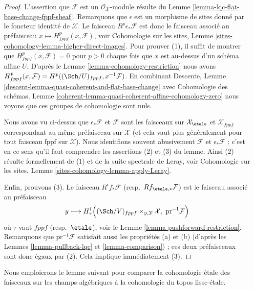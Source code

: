 \begin{proof}
L'assertion que $\mathcal{F}$ est un $\mathcal{O}_\mathcal{X}$-module
résulte du
Lemme \ref{lemma-lqc-flat-base-change-fppf-sheaf}.
Remarquons que $\epsilon$ est un morphisme de sites donné par le foncteur
identité de $\mathcal{X}$. Le faisceau $R^p\epsilon_*\mathcal{F}$ est donc
le faisceau associé au préfaisceau
$x \mapsto H^p_{fppf}(x, \mathcal{F})$, voir
Cohomologie sur les sites, Lemme \ref{sites-cohomology-lemma-higher-direct-images}.
Pour prouver (1), il suffit de montrer que
$H^p_{fppf}(x, \mathcal{F}) = 0$ pour $p > 0$
chaque fois que $x$ est au-dessus d'un schéma affine $U$. D'après le
Lemme \ref{lemma-cohomology-restriction}
nous avons
$H^p_{fppf}(x, \mathcal{F}) = H^p((\Sch/U)_{fppf}, x^{-1}\mathcal{F})$.
En combinant
Descente, Lemme \ref{descent-lemma-quasi-coherent-and-flat-base-change}
avec Cohomologie des schémas, Lemme
\ref{coherent-lemma-quasi-coherent-affine-cohomology-zero}
nous voyons que ces groupes de cohomologie sont nuls.

\medskip\noindent
Nous avons vu ci-dessus que $\epsilon_*\mathcal{F}$ et $\mathcal{F}$ sont les
faisceaux sur $\mathcal{X}_\etale$ et $\mathcal{X}_{fppf}$
correspondant au même préfaisceau sur $\mathcal{X}$ (et cela vaut plus
généralement pour tout faisceau fppf sur $\mathcal{X}$).
Nous identifions souvent abusivement $\mathcal{F}$ et $\epsilon_*\mathcal{F}$ ;
c'est en ce sens qu'il faut comprendre les assertions (2) et (3) du
lemme. Ainsi (2) résulte formellement de (1) et de la suite spectrale de
Leray, voir
Cohomologie sur les sites, Lemme \ref{sites-cohomology-lemma-apply-Leray}.

\medskip\noindent
Enfin, prouvons (3). Le faisceau $R^if_*\mathcal{F}$
(resp.\ $Rf_{\etale, *}\mathcal{F}$)
est le faisceau associé au préfaisceau
$$
y \longmapsto
H^i_\tau\Big((\Sch/V)_{fppf} \times_{y, \mathcal{Y}} \mathcal{X},
\ \text{pr}^{-1}\mathcal{F}\Big)
$$
où $\tau$ vaut $fppf$ (resp.\ $\etale$), voir le
Lemme \ref{lemma-pushforward-restriction}.
Remarquons que $\text{pr}^{-1}\mathcal{F}$ satisfait aussi les propriétés (a) et (b)
(d'après les Lemmes \ref{lemma-pullback-lqc} et \ref{lemma-comparison}) ;
ces deux préfaisceaux sont donc égaux par (2).
Cela implique immédiatement (3).
\end{proof}

\noindent
Nous emploierons le lemme suivant pour comparer la cohomologie \'etale des faisceaux
sur les champs algébriques à la cohomologie du topos lisse-\'etale.

